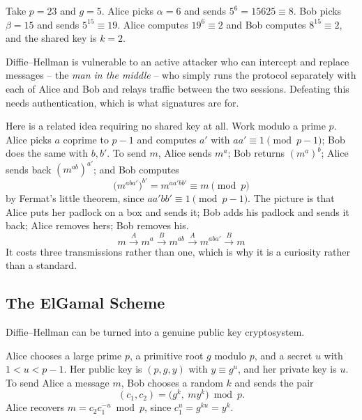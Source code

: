 \documentclass[a4paper]{scrartcl}
\begin{document}
\begin{example}
	Take $p = 23$ and $g = 5$. Alice picks $\alpha = 6$ and sends $5^6 = 15625 \equiv 8$. Bob picks $\beta = 15$ and sends $5^{15}\equiv19$. Alice computes $19^6 \equiv 2$ and Bob computes $8^{15}\equiv2$, and the shared key is $k = 2$.
\end{example}

\begin{remark}
	Diffie--Hellman is vulnerable to an active attacker who can intercept and replace messages -- the \emph{man in the middle} -- who simply runs the protocol separately with each of Alice and Bob and relays traffic between the two sessions. Defeating this needs authentication, which is what signatures are for.
\end{remark}

\begin{example}
	Here is a related idea requiring no shared key at all. Work modulo a prime $p$. Alice picks $a$ coprime to $p-1$ and computes $a'$ with $aa'\equiv1\pmod{p-1}$; Bob does the same with $b, b'$. To send $m$, Alice sends $m^a$; Bob returns $(m^a)^b$; Alice sends back $(m^{ab})^{a'}$; and Bob computes
	$$\bigl(m^{aba'}\bigr)^{b'} = m^{aa'bb'} \equiv m \pmod p$$
	by Fermat's little theorem, since $aa'bb'\equiv1\pmod{p-1}$. The picture is that Alice puts her padlock on a box and sends it; Bob adds his padlock and sends it back; Alice removes hers; Bob removes his.
	$$m \xrightarrow{\ A\ } m^a \xrightarrow{\ B\ } m^{ab} \xrightarrow{\ A\ } m^{aba'} \xrightarrow{\ B\ } m$$
	It costs three transmissions rather than one, which is why it is a curiosity rather than a standard.
\end{example}

\subsection{The ElGamal Scheme}

Diffie--Hellman can be turned into a genuine public key cryptosystem.

\begin{definition}
	Alice chooses a large prime $p$, a primitive root $g$ modulo $p$, and a secret $u$ with $1<u<p-1$. Her public key is $(p,g,y)$ with $y \equiv g^u$, and her private key is $u$. To send Alice a message $m$, Bob chooses a random $k$ and sends the pair
	$$(c_1,c_2) = \bigl(g^k,\ my^k\bigr) \bmod p.$$
	Alice recovers $m = c_2 c_1^{-u} \bmod p$, since $c_1^u = g^{ku} = y^k$.
\end{definition}
\end{document}
